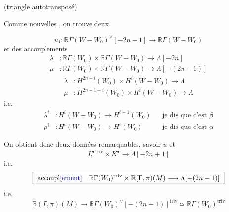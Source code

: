 \documentclass[11pt,a4paper]{article}
\begin{document}

(triangle autotransposé)



Comme nouvelles  , on trouve \ill{} deux

\[
  \boxed{\ u_1 : \mathbb{R}\Gamma(W - W_0)^\vee[-2n-1] \longrightarrow \mathbb{R}\Gamma(W - W_0)\ }
\]
et des accouplements
\[
  \boxed{\begin{aligned}
    \lambda &: \mathbb{R}\Gamma(W_0) \times \mathbb{R}\Gamma(W - W_0) \longrightarrow \Lambda[-2n] \\
    \mu &: \mathbb{R}\Gamma(W_0) \times \mathbb{R}\Gamma(W - W_0) \longrightarrow \Lambda[-(2n-1)]
  \end{aligned}}
\]
\[
  \begin{aligned}
    \lambda &: H^{2n-i}(W_0) \times H^{i}(W - W_0) \longrightarrow \Lambda \\
    \mu &: H^{2n-1-i}(W_0) \times H^{i}(W - W_0) \longrightarrow \Lambda
  \end{aligned}
\]
i.e.
\[
  \begin{aligned}
    \lambda^i &: H^{i}(W - W_0) \longrightarrow H^{i-1}(W_0) && \text{je dis que c'est } \beta \\
    \mu^i &: H^{i}(W - W_0) \longrightarrow H^{i}(W_0) && \text{je dis que c'est } \alpha
  \end{aligned}
\]


On obtient donc deux données remarquables, savoir $u$ et
\[
  L^{\bullet\,\mathrm{triv}} \times K^\bullet \longrightarrow \Lambda[-2n+1]
\]
i.e.
\[
  \boxed{\ \text{accoupl\supplied{ement}}\quad \mathbb{R}\Gamma(W_0)^{\mathrm{triv}} \times
  \mathbb{R}(\Gamma, \pi)(M) \longrightarrow \Lambda[-(2n-1)]\ }
\]
i.e.
\[
  \mathbb{R}(\Gamma, \pi)(M) \longrightarrow
  \mathbb{R}\Gamma(W_0)^\vee[-(2n-1)]^{\mathrm{triv}} \simeq \mathbb{R}\Gamma(W_0)^{\mathrm{triv}}
\]
\end{document}
